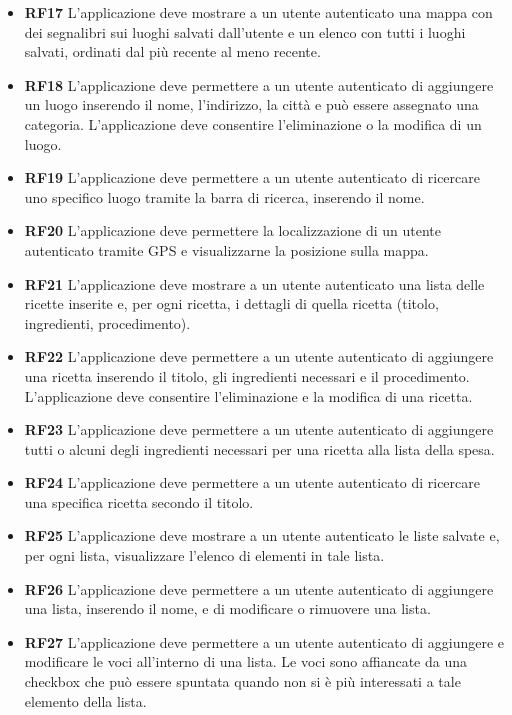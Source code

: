 \documentclass[a4paper,12pt]{article}
\begin{document}
\begin{itemize}
\item \textbf {\hypertarget{RF17}{RF17}} L'applicazione deve mostrare a un utente autenticato una mappa con dei segnalibri sui luoghi salvati dall'utente e un elenco con tutti i luoghi salvati, ordinati dal più recente al meno recente.
\item \textbf {\hypertarget{RF18}{RF18}} L'applicazione deve permettere a un utente autenticato di aggiungere un luogo inserendo il nome, l'indirizzo, la città e può essere assegnato una categoria. L'applicazione deve consentire l'eliminazione o la modifica di un luogo.
\item \textbf {\hypertarget{RF19}{RF19}} L'applicazione deve permettere a un utente autenticato di ricercare uno specifico luogo tramite la barra di ricerca, inserendo il nome.
\item \textbf {\hypertarget{RF20}{RF20}} L'applicazione deve permettere la localizzazione di un utente autenticato tramite GPS e visualizzarne la posizione sulla mappa.
\item \textbf {\hypertarget{RF21}{RF21}} L'applicazione deve mostrare a un utente autenticato una lista delle ricette inserite e, per ogni ricetta, i dettagli di quella ricetta (titolo, ingredienti, procedimento).
\item \textbf {\hypertarget{RF22}{RF22}} L'applicazione deve permettere a un utente autenticato di aggiungere una ricetta inserendo il titolo, gli ingredienti necessari e il procedimento. L'applicazione deve consentire l'eliminazione e la modifica di una ricetta.
\item \textbf {\hypertarget{RF23}{RF23}} L'applicazione deve permettere a un utente autenticato di aggiungere tutti o alcuni degli ingredienti necessari per una ricetta alla lista della spesa.
\item \textbf {\hypertarget{RF24}{RF24}} L'applicazione deve permettere a un utente autenticato di ricercare una specifica ricetta secondo il titolo.
\item \textbf {\hypertarget{RF25}{RF25}} L'applicazione deve mostrare a un utente autenticato le liste salvate e, per ogni lista, visualizzare l'elenco di elementi in tale lista.
\item \textbf {\hypertarget{RF26}{RF26}} L'applicazione deve permettere a un utente autenticato di aggiungere una lista, inserendo il nome, e di modificare o rimuovere una lista.
\item \textbf {\hypertarget{RF27}{RF27}} L'applicazione deve permettere a un utente autenticato di aggiungere e modificare le voci all'interno di una lista. Le voci sono affiancate da una checkbox che può essere spuntata quando non si è più interessati a tale elemento della lista. 

\end{itemize}
\end{document}
